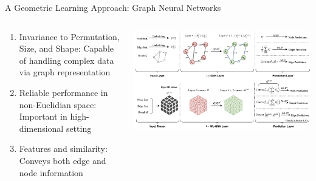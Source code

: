 \begin{frame}{A Geometric Learning Approach: Graph Neural Networks}

    \begin{columns}
    \begin{column}{0.4\linewidth}
    \vspace{5pt}
      \begin{enumerate}
         \item {Invariance to Permutation, Size, and Shape: Capable of handling complex data via graph representation}
         \item {Reliable performance in non-Euclidian space: Important in high-dimensional setting}
         \item {Features and similarity: Conveys both edge and node information}
      \end{enumerate}
    \end{column}
    \begin{column}{0.6\linewidth}
      \centering
      \includegraphics[scale=0.1]{figures/gnn_summ.png}
      \caption{\footnotesize{Summary of 2-D and 3-D Graph Neural Networks}}
    \end{column}
  \end{columns}
\end{frame}

